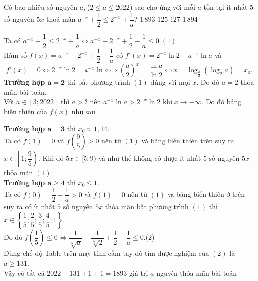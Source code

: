 \begin{ex}%
	Có bao nhiêu số nguyên $a$, ($2 \leq a \leq 2022$) sao cho ứng với mỗi $a$ tồn tại ít nhất $5$ số nguyên $5x$ thoả mãn $a^{-x}+\dfrac{1}{2} \leq 2^{-x}+\dfrac{1}{a}$?
	\choice
	{\True $1\,893$}
	{$125$}
	{$127$}
	{$1\, 894$}
	\loigiai
	{Ta có $a^{-x}+\dfrac{1}{2} \leq 2^{-x}+\dfrac{1}{a}\Leftrightarrow a^{-x}-2^{-x}+\dfrac{1}{2}-\dfrac{1}{a}\leq 0$.\quad $(1)$\\
	Hàm số $f(x)=a^{-x}-2^{-x}+\dfrac{1}{2}-\dfrac{1}{a}$ có $f'(x)=2^{-x}\ln 2-a^{-x}\ln a$ và $$f'(x)=0\Leftrightarrow 2^{-x}\ln 2=a^{-x}\ln a\Leftrightarrow\left(\dfrac{a}{2}\right)^x=\dfrac{\ln a}{\ln 2}\Leftrightarrow x=\log_{\tfrac{a}{2}}\left(\log_2 a\right)=x_0.$$
	{\bf Trường hợp $\boldsymbol{a=2}$} thì bất phương trình $(1)$ đúng với mọi $x$. Do đó $a=2$ thỏa mãn bài toán.\\
	Với $a\in [3;2022]$ thì $a>2$ nên $a^{-x}\ln a>2^{-x}\ln 2$ khi $x\to -\infty$. Do đó bảng biến thiên của $f(x)$ như sau
	\begin{center}
	\end{center}
	{\bf Trường hợp $\boldsymbol{a=3}$} thì $x_0\approx 1{,}14$.\\
	Ta có $f(1)=0$ và $f\left(\dfrac{9}{5}\right)>0$ nên từ $(1)$ và bảng biến thiên trên suy ra $x\in\left[1;\dfrac{9}{5}\right)$. Khi đó $5x\in [5;9)$ và như thế không có được ít nhất $5$ số nguyên $5x$ thỏa mãn $(1)$.\\
	{\bf Trường hợp $\boldsymbol{a\geq 4}$} thì $x_0\leq 1$.\\
	Ta có $f(0)=\dfrac{1}{2}-\dfrac{1}{a}>0$ và $f(1)=0$ nên từ $(1)$ và bảng biến thiên ở trên suy ra có ít nhất $5$ số nguyên $5x$ thỏa mãn bất phương trình $(1)$ thì $x\in\left\{\dfrac{1}{5};\dfrac{2}{5};\dfrac{3}{5};\dfrac{4}{5};1\right\}$.\\
	Do đó $f\left(\dfrac{1}{5}\right)\leq 0\Leftrightarrow \dfrac{1}{\sqrt[5]{a}}-\dfrac{1}{\sqrt[5]{2}}+\dfrac{1}{2}-\dfrac{1}{a}\leq 0$.\quad (2)\\
	Dùng chế độ Table trên máy tính cầm tay dò tìm được nghiệm của $(2)$ là $a\geq 131$.\\
	Vậy có tất cả $2022-131+1+1=1893$ giá trị $a$ nguyên thỏa mãn bài toán
	}
\end{ex}
